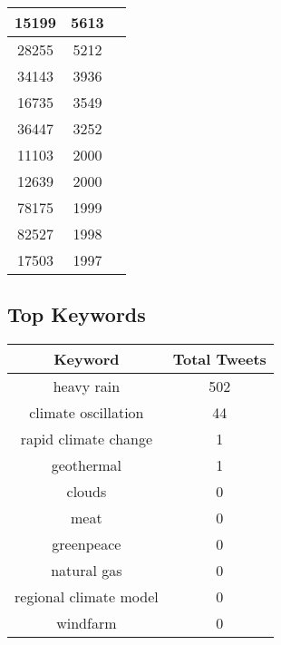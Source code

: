 \documentclass{article}\usepackage[T1]{fontenc}
\begin{document}
\begin{tabular}{|c|c|c|}
 \hline
15199 & 5613\\ 
 \hline
28255 & 5212\\ 
 \hline
34143 & 3936\\ 
 \hline
16735 & 3549\\ 
 \hline
36447 & 3252\\ 
 \hline
11103 & 2000\\ 
 \hline
12639 & 2000\\ 
 \hline
78175 & 1999\\ 
 \hline
82527 & 1998\\ 
 \hline
17503 & 1997\\ 
 \hline
\end{tabular}\subsection*{Top Keywords}\begin{tabular}{|c|c|}         \hline         Keyword & Total Tweets \\ 
 \hline
heavy rain & 502\\ 
 \hline
climate oscillation & 44\\ 
 \hline
rapid climate change & 1\\ 
 \hline
geothermal & 1\\ 
 \hline
clouds & 0\\ 
 \hline
meat & 0\\ 
 \hline
greenpeace & 0\\ 
 \hline
natural gas & 0\\ 
 \hline
regional climate model & 0\\ 
 \hline
windfarm & 0\\ 
 \hline
\end{tabular}
\end{document}
